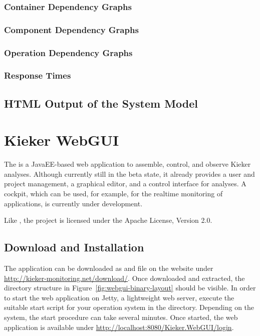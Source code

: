 			\subsubsection{Container Dependency Graphs}
			\subsubsection{Component Dependency Graphs}
			\subsubsection{Operation Dependency Graphs}
			\subsubsection{Response Times}
		\subsection{HTML Output of the System Model}	
			
	\section{Kieker WebGUI}\label{chp:Kieker-WebGUI}
			
		The \KiekerWebGUI{} is a JavaEE-based web application to assemble, control, and observe Kieker analyses. Although currently still in the beta state, it already provides a user and project management, a graphical editor, and a control interface for analyses. A cockpit, which can be used, for example, for the realtime monitoring of applications, is currently under development.

		Like \Kieker{}, the \KiekerWebGUI{} project is licensed under the Apache License, Version 2.0. 
		
		\subsection{Download and Installation}
		
			The application can be downloaded as  and  file on the \Kieker{} website under \url{http://kieker-monitoring.net/download/}. Once downloaded and extracted, the directory structure in Figure~\ref{fig:webgui-binary-layout} should be visible. In order to start the web application on Jetty, a lightweight web server, execute the suitable start script for your operation system in the  directory. Depending on the system, the start procedure can take several minutes. Once started, the web application is available under \url{http://localhost:8080/Kieker.WebGUI/login}.
			
